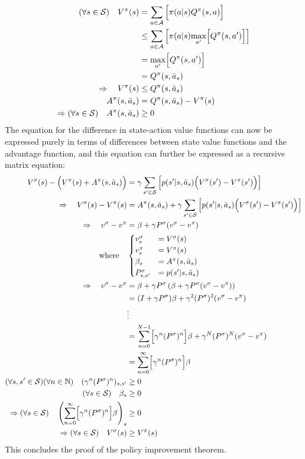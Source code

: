\begin{align*}
    (\forall s\in\mathcal{S})\quad V^\pi(s) &= \sum_{a\in\mathcal{A}}{\Bigl[ \pi(a\vert s) Q^\pi(s, a) \Bigr]} \\
    &\le \sum_{a\in\mathcal{A}}{\left[ \pi(a\vert s) \underset{a'}{\operatorname{max}}\Bigl[ Q^\pi(s, a') \Bigr] \right]} \\
    &= \underset{a'}{\operatorname{max}}\Bigl[ Q^\pi(s, a') \Bigr] \\
    &= Q^\pi(s, \bar{a}_s) \\
    \Rightarrow\quad V^\pi(s) &\le Q^\pi(s, \bar{a}_s) \\
    A^\pi(s, \bar{a}_s) &= Q^\pi(s, \bar{a}_s) - V^\pi(s) \\
    \Rightarrow(\forall s\in\mathcal{S})\quad A^\pi(s, \bar{a}_s) &\ge 0
\end{align*}
The equation for the difference in state-action value functions can now be expressed purely in terms of differences between state value functions and the advantage function, and this equation can further be expressed as a recursive matrix equation:
\begin{align*}
    V^\sigma(s) - \Bigl(V^\pi(s) + A^\pi(s, \bar{a}_s)\Bigr) &= \gamma\sum_{s'\in\mathcal{S}}{\left[ p(s'\vert s, \bar{a}_s) \Bigl( V^\sigma(s') - V^\pi(s')\Bigr) \right]} \\
    \Rightarrow\quad V^\sigma(s) - V^\pi(s) &= A^\pi(s, \bar{a}_s) + \gamma\sum_{s'\in\mathcal{S}}{\left[ p(s'\vert s, \bar{a}_s) \Bigl( V^\sigma(s') - V^\pi(s')\Bigr) \right]} \\
    \Rightarrow\quad v^\sigma - v^\pi &= \beta + \gamma P^\sigma(v^\sigma - v^\pi) \\
    \text{where} \quad & \begin{cases}
        v^\sigma_s &= V^\sigma(s) \\
        v^\pi_s &= V^\pi(s) \\
        \beta_s &= A^\pi(s, \bar{a}_s) \\
        P^\sigma_{s, s'} &= p(s'\vert s, \bar{a}_s)
    \end{cases} \\
    \Rightarrow\quad v^\sigma - v^\pi &= \beta + \gamma P^\sigma\left(\beta + \gamma P^\sigma(v^\sigma - v^\pi)\right) \\
    &= (I + \gamma P^\sigma)\beta + \gamma^2 (P^\sigma)^2(v^\sigma - v^\pi) \\
    &\vdots \\
    &= \sum_{n=0}^{N-1} \Bigl[ \gamma^n (P^\sigma)^n \Bigr] \beta + \gamma^N (P^\sigma)^N (v^\sigma - v^\pi) \\
    &= \sum_{n=0}^{\infty} \Bigl[ \gamma^n (P^\sigma)^n \Bigr] \beta \\
    (\forall s,s'\in\mathcal{S})(\forall n\in\mathbb{N}) \quad (\gamma^n (P^\sigma)^n)_{s,s'} &\ge 0 \\
    (\forall s\in\mathcal{S}) \quad \beta_s &\ge 0 \\
    \Rightarrow (\forall s\in\mathcal{S}) \quad \left(\sum_{n=0}^{\infty} \Bigl[ \gamma^n (P^\sigma)^n \Bigr] \beta\right)_s &\ge 0 \\
    \Rightarrow (\forall s\in\mathcal{S}) \quad V^\sigma(s) &\ge V^\pi(s)
\end{align*}
This concludes the proof of the policy improvement theorem.
